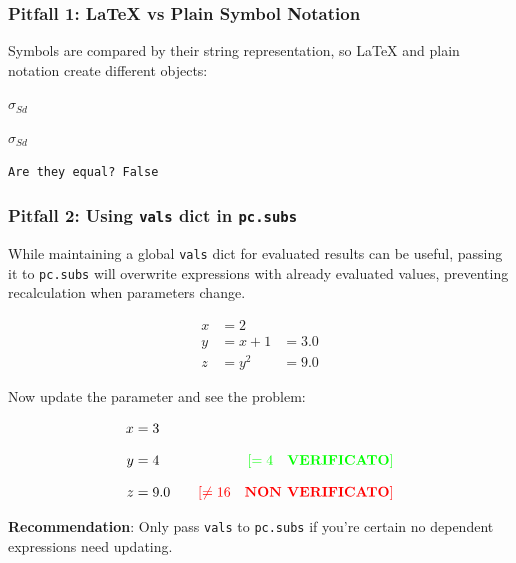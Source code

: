 \documentclass[
  letterpaper,
  DIV=11,
  numbers=noendperiod,
  fleqn]{scrartcl}
\begin{document}
\subsubsection{Pitfall 1: LaTeX vs Plain Symbol
Notation}\label{pitfall-1-latex-vs-plain-symbol-notation}

Symbols are compared by their string representation, so LaTeX and plain
notation create different objects:

$\displaystyle \sigma_{Sd}$

$\displaystyle \sigma_{Sd}$

\begin{verbatim}
Are they equal? False
\end{verbatim}

\subsubsection{\texorpdfstring{Pitfall 2: Using \texttt{vals} dict in
\texttt{pc.subs}}{Pitfall 2: Using vals dict in pc.subs}}\label{pitfall-2-using-vals-dict-in-pc.subs}

While maintaining a global \texttt{vals} dict for evaluated results can
be useful, passing it to \texttt{pc.subs} will overwrite expressions
with already evaluated values, preventing recalculation when parameters
change.

\begin{align}
x & = 2 &    \\[8pt]
 y & = x + 1 & = 3.0  \\[8pt]
 z & = y^{2} & = 9.0 
\end{align}

Now update the parameter and see the problem:

\begin{align}
x & = 3 &    \\[8pt]
 y & = 4 & \quad\text{$\textcolor{green}{\left[=4\quad \textbf{VERIFICATO}\right]}$}  \\[8pt]
 z & = 9.0 & \quad\text{$\textcolor{red}{\left[\neq16\quad \textbf{NON VERIFICATO}\right]}$} 
\end{align}

\begin{tcolorbox}[enhanced jigsaw, colback=white, toprule=.15mm, coltitle=black, arc=.35mm, opacitybacktitle=0.6, rightrule=.15mm, opacityback=0, leftrule=.75mm, titlerule=0mm, colbacktitle=quarto-callout-tip-color!10!white, left=2mm, bottomtitle=1mm, breakable, toptitle=1mm, title=\textcolor{quarto-callout-tip-color}{\faLightbulb}\hspace{0.5em}{Tip}, bottomrule=.15mm, colframe=quarto-callout-tip-color-frame]

\textbf{Recommendation}: Only pass \texttt{vals} to \texttt{pc.subs} if
you're certain no dependent expressions need updating.

\end{tcolorbox}
\end{document}
